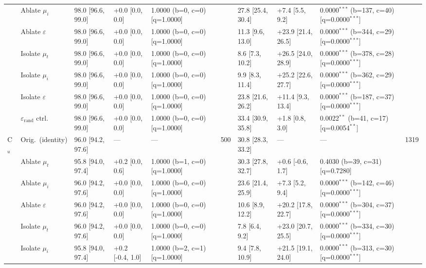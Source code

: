 \begin{table}[h!]
\begin{tabular}{ll lllc lllc}
 & Ablate $\mu_i$ & 98.0 [96.6, 99.0] & +0.0 [0.0, 0.0] & 1.0000 (b=0, c=0) [q=1.0000] &  & 27.8 [25.4, 30.4] & +7.4 [5.5, 9.2] & 0.0000$^{***}$ (b=137, c=40) [q=0.0000$^{***}$] &  \\
 & Ablate $\varepsilon$ & 98.0 [96.6, 99.0] & +0.0 [0.0, 0.0] & 1.0000 (b=0, c=0) [q=1.0000] &  & 11.3 [9.6, 13.0] & +23.9 [21.4, 26.5] & 0.0000$^{***}$ (b=344, c=29) [q=0.0000$^{***}$] &  \\
 & Isolate $\mu_t$ & 98.0 [96.6, 99.0] & +0.0 [0.0, 0.0] & 1.0000 (b=0, c=0) [q=1.0000] &  & 8.6 [7.3, 10.2] & +26.5 [24.0, 28.9] & 0.0000$^{***}$ (b=378, c=28) [q=0.0000$^{***}$] &  \\
 & Isolate $\mu_i$ & 98.0 [96.6, 99.0] & +0.0 [0.0, 0.0] & 1.0000 (b=0, c=0) [q=1.0000] &  & 9.9 [8.3, 11.4] & +25.2 [22.6, 27.7] & 0.0000$^{***}$ (b=362, c=29) [q=0.0000$^{***}$] &  \\
 & Isolate $\varepsilon$ & 98.0 [96.6, 99.0] & +0.0 [0.0, 0.0] & 1.0000 (b=0, c=0) [q=1.0000] &  & 23.8 [21.6, 26.2] & +11.4 [9.3, 13.4] & 0.0000$^{***}$ (b=187, c=37) [q=0.0000$^{***}$] &  \\
 & $\varepsilon_\mathrm{rand}$ ctrl. & 98.0 [96.6, 99.0] & +0.0 [0.0, 0.0] & 1.0000 (b=0, c=0) [q=1.0000] &  & 33.4 [30.9, 35.8] & +1.8 [0.8, 3.0] & 0.0022$^{**}$ (b=41, c=17) [q=0.0054$^{**}$] &  \\
\cmidrule(lr){2-10}
\multirow{8}{*}{C$_u$} & Orig.\ (identity) & 96.0 [94.2, 97.6] & --- & --- & 500 & 30.8 [28.3, 33.2] & --- & --- & 1319 \\
 & Ablate $\mu_t$ & 95.8 [94.0, 97.4] & +0.2 [0.0, 0.6] & 1.0000 (b=1, c=0) [q=1.0000] &  & 30.3 [27.8, 32.7] & +0.6 [-0.6, 1.7] & 0.4030 (b=39, c=31) [q=0.7280] &  \\
 & Ablate $\mu_i$ & 96.0 [94.2, 97.6] & +0.0 [0.0, 0.0] & 1.0000 (b=0, c=0) [q=1.0000] &  & 23.6 [21.4, 25.9] & +7.3 [5.2, 9.4] & 0.0000$^{***}$ (b=142, c=46) [q=0.0000$^{***}$] &  \\
 & Ablate $\varepsilon$ & 96.0 [94.2, 97.6] & +0.0 [0.0, 0.0] & 1.0000 (b=0, c=0) [q=1.0000] &  & 10.6 [8.9, 12.2] & +20.2 [17.8, 22.7] & 0.0000$^{***}$ (b=304, c=37) [q=0.0000$^{***}$] &  \\
 & Isolate $\mu_t$ & 96.0 [94.2, 97.6] & +0.0 [0.0, 0.0] & 1.0000 (b=0, c=0) [q=1.0000] &  & 7.8 [6.4, 9.2] & +23.0 [20.7, 25.5] & 0.0000$^{***}$ (b=334, c=30) [q=0.0000$^{***}$] &  \\
 & Isolate $\mu_i$ & 95.8 [94.0, 97.4] & +0.2 [-0.4, 1.0] & 1.0000 (b=2, c=1) [q=1.0000] &  & 9.4 [7.8, 10.9] & +21.5 [19.1, 24.0] & 0.0000$^{***}$ (b=313, c=30) [q=0.0000$^{***}$] &  \\

\end{tabular}
\end{table}
